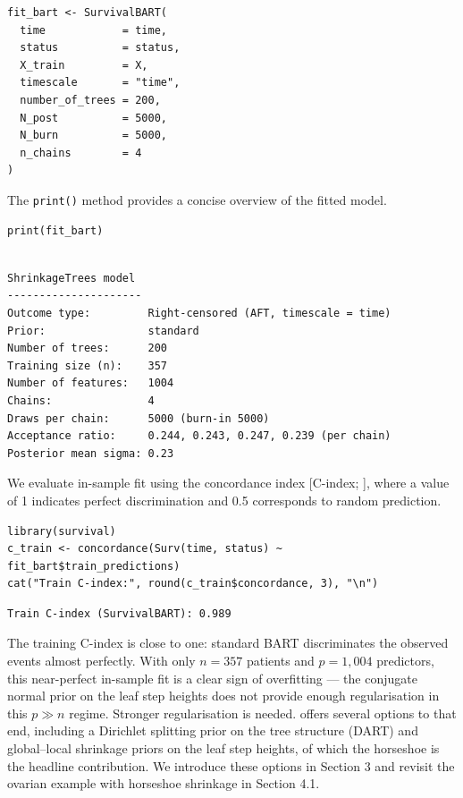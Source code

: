 \begin{verbatim}
fit_bart <- SurvivalBART(
  time            = time,
  status          = status,
  X_train         = X,
  timescale       = "time",
  number_of_trees = 200,
  N_post          = 5000,
  N_burn          = 5000,
  n_chains        = 4
)
\end{verbatim}

The \texttt{print()} method provides a concise overview of the fitted model.

\begin{verbatim}
print(fit_bart)
\end{verbatim}

\begin{verbatim}

ShrinkageTrees model
---------------------
Outcome type:         Right-censored (AFT, timescale = time)
Prior:                standard
Number of trees:      200
Training size (n):    357
Number of features:   1004
Chains:               4
Draws per chain:      5000 (burn-in 5000)
Acceptance ratio:     0.244, 0.243, 0.247, 0.239 (per chain)
Posterior mean sigma: 0.23
\end{verbatim}

We evaluate in-sample fit using the concordance index {[}C-index; \citet{harrell1996concordance}{]}, where a value of 1 indicates perfect discrimination and 0.5 corresponds to random prediction.

\begin{verbatim}
library(survival)
c_train <- concordance(Surv(time, status) ~ fit_bart$train_predictions)
cat("Train C-index:", round(c_train$concordance, 3), "\n")
\end{verbatim}

\begin{verbatim}
Train C-index (SurvivalBART): 0.989
\end{verbatim}

The training C-index is close to one: standard BART discriminates the observed events almost perfectly. With only \(n = 357\) patients and \(p = 1{,}004\) predictors, this near-perfect in-sample fit is a clear sign of overfitting --- the conjugate normal prior on the leaf step heights does not provide enough regularisation in this \(p \gg n\) regime. Stronger regularisation is needed.  offers several options to that end, including a Dirichlet splitting prior on the tree structure (DART) and global--local shrinkage priors on the leaf step heights, of which the horseshoe is the headline contribution. We introduce these options in Section 3 and revisit the ovarian example with horseshoe shrinkage in Section 4.1.

